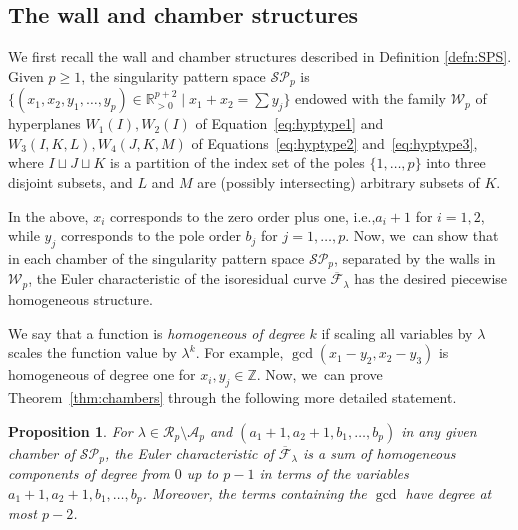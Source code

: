 \documentclass[11pt]{article}
\newcommand{\ie}{i.e.,\xspace}
\newtheorem{prop}[thm]{Proposition}
\theoremstyle{definition}
\begin{document}
\subsection{The wall and chamber structures}\label{sub:Discretecombinatorics}

We first recall the wall and chamber structures described in Definition \ref{defn:SPS}.
Given $p \geq 1$, the singularity pattern space $\mathcal{SP}_{p}$ is $\bigl\{ (x_{1},x_{2},y_{1},\dots,y_{p}) \in \mathbb{R}_{>0}^{p+2} \mid x_{1}+x_{2}= \sum y_{j} \bigr\}$ endowed with the family $\mathcal{W}_{p}$ of hyperplanes $W_{1}(I),W_{2}(I)$ of Equation~\eqref{eq:hyptype1} and $W_{3}(I,K,L),W_{4}(J,K,M)$ of Equations~\eqref{eq:hyptype2} and~\eqref{eq:hyptype3}, where $I \sqcup J \sqcup K$ is a partition of the index set of the poles $\lbrace{ 1,\dots,p \rbrace}$ into three disjoint subsets, and $L$ and $M$ are (possibly intersecting) arbitrary subsets of $K$.

In the above, $x_i$ corresponds to the zero order plus one, \ie $a_i+1$ for $i=1,2$, while $y_j$ corresponds to the pole order $b_j$ for $j=1,\ldots,p$. Now, we~can show that in each chamber of the singularity pattern space $\mathcal{SP}_p$, separated by the walls in $\mathcal{W}_{p}$, the Euler characteristic of the isoresidual curve $\overline{\mathcal{F}}_\lambda$ has the desired piecewise homogeneous structure.

We say that a function is {\em homogeneous of degree $k$} if scaling all variables by $\lambda$ scales the function value by $\lambda^k$. For example, $\gcd(x_1 - y_2, x_2 - y_3)$ is homogeneous of degree one for
$x_i, y_j\in \mathbb{Z}$. Now, we~can prove Theorem~\ref{thm:chambers} through the following more detailed statement.

\begin{prop}\label{prop:chambers}
For $\lambda \in \mathcal{R}_{p}\setminus \mathcal{A}_{p}$ and $(a_1+1, a_2+1, b_1, \ldots, b_p)$ in any given chamber of $\mathcal{SP}_p$, the Euler characteristic of $\overline{\mathcal F}_\lambda$ is a sum of homogeneous components of degree from $0$ up to $p-1$ in terms of the variables $a_{1}+1,a_{2}+1,b_{1},\dots,b_{p}$. Moreover, the terms containing the $\gcd$ have degree at most $p-2$.
\end{prop}
\end{document}
